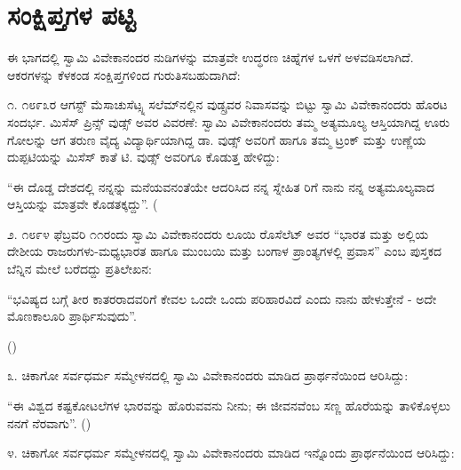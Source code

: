
\chapter{ಸಂಕ್ಷಿಪ್ತಗಳ ಪಟ್ಟಿ}

ಈ ಭಾಗದಲ್ಲಿ ಸ್ವಾಮಿ ವಿವೇಕಾನಂದರ ನುಡಿಗಳನ್ನು ಮಾತ್ರವೇ ಉದ್ಧರಣ ಚಿಹ್ನೆಗಳ ಒಳಗೆ ಅಳವಡಿಸಲಾಗಿದೆ. ಆಕರಗಳನ್ನು ಕೆಳಕಂಡ ಸಂಕ್ಷಿಪ್ತಗಳಿಂದ ಗುರುತಿಸಬಹುದಾಗಿದೆ:





೧. ೧೮೯೩ರ ಆಗಸ್ಟ್ ಮೆಸಾಚುಸೆಟ್ಸ್ನ ಸಲೆಮ್​ನಲ್ಲಿನ ವುಡ್ಸ್ರವರ ನಿವಾಸವನ್ನು ಬಿಟ್ಟು ಸ್ವಾಮಿ ವಿವೇಕಾನಂದರು ಹೊರಟ ಸಂದರ್ಭ. ಮಿಸೆಸ್ ಪ್ರಿನ್ಸ್ ವುಡ್ಸ್ ಅವರ ವಿವರಣೆ: ಸ್ವಾಮಿ ವಿವೇಕಾನಂದರು ತಮ್ಮ ಅತ್ಯಮೂಲ್ಯ ಆಸ್ತಿಯಾಗಿದ್ದ ಊರು ಗೋಲನ್ನು ಆಗ ತರುಣ ವೈದ್ಯ ವಿದ್ಯಾರ್ಥಿಯಾಗಿದ್ದ ಡಾ. ವುಡ್ಸ್ ಅವರಿಗೆ ಹಾಗೂ ತಮ್ಮ ಟ್ರಂಕ್ ಮತ್ತು ಉಣ್ಣೆಯ ದುಪ್ಪಟಿಯನ್ನು ಮಿಸೆಸ್ ಕಾತೆ ಟಿ. ವುಡ್ಸ್ ಅವರಿಗೂ ಕೊಡುತ್ತ ಹೇಳಿದ್ದು:

“ಈ ದೊಡ್ಡ ದೇಶದಲ್ಲಿ ನನ್ನನ್ನು ಮನೆಯವನಂತೆಯೇ ಆದರಿಸಿದ ನನ್ನ ಸ್ನೇಹಿತ ರಿಗೆ ನಾನು ನನ್ನ ಅತ್ಯಮೂಲ್ಯವಾದ ಆಸ್ತಿಯನ್ನು ಮಾತ್ರವೇ ಕೊಡತಕ್ಕದ್ದು”. (

೨. ೧೮೯೪ ಫೆಬ್ರವರಿ ೧೧ರಂದು ಸ್ವಾಮಿ ವಿವೇಕಾನಂದರು ಲೂಯಿ ರೊಸೆಲೆಟ್ ಅವರ “ಭಾರತ ಮತ್ತು ಅಲ್ಲಿಯ ದೇಶೀಯ ರಾಜರುಗಳು-ಮಧ್ಯಭಾರತ ಹಾಗೂ ಮುಂಬಯಿ ಮತ್ತು ಬಂಗಾಳ ಪ್ರಾಂತ್ಯಗಳಲ್ಲಿ ಪ್ರವಾಸ” ಎಂಬ ಪುಸ್ತಕದ ಬೆನ್ನಿನ ಮೇಲೆ ಬರೆದದ್ದು ಪ್ರತಿಲೇಖನ:

“ಭವಿಷ್ಯದ ಬಗ್ಗೆ ತೀರ ಕಾತರರಾದವರಿಗೆ ಕೇವಲ ಒಂದೇ ಒಂದು ಪರಿಹಾರವಿದೆ ಎಂದು ನಾನು ಹೇಳುತ್ತೇನೆ - ಅದೇ ಮೊಣಕಾಲೂರಿ ಪ್ರಾರ್ಥಿಸುವುದು”.

()

೩. ಚಿಕಾಗೋ ಸರ್ವಧರ್ಮ ಸಮ್ಮೇಳನದಲ್ಲಿ ಸ್ವಾಮಿ ವಿವೇಕಾನಂದರು ಮಾಡಿದ ಪ್ರಾರ್ಥನೆಯಿಂದ ಆರಿಸಿದ್ದು:

“ಈ ವಿಶ್ವದ ಕಷ್ಟಕೋಟಲೆಗಳ ಭಾರವನ್ನು ಹೊರುವವನು ನೀನು; ಈ ಜೀವನವೆಂಬ ಸಣ್ಣ ಹೊರೆಯನ್ನು ತಾಳಿಕೊಳ್ಳಲು ನನಗೆ ನೆರವಾಗು”. ()

೪. ಚಿಕಾಗೋ ಸರ್ವಧರ್ಮ ಸಮ್ಮೇಳನದಲ್ಲಿ ಸ್ವಾಮಿ ವಿವೇಕಾನಂದರು ಮಾಡಿದ ಇನ್ನೊಂದು ಪ್ರಾರ್ಥನೆಯಿಂದ ಆರಿಸಿದ್ದು:

